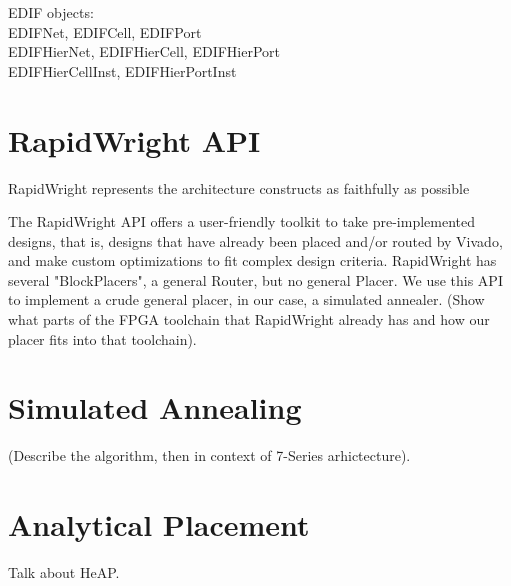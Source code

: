\documentclass{article}
\begin{document}
\begin{multicols}{2}
    EDIF objects: \\
        EDIFNet, EDIFCell, EDIFPort \\
        EDIFHierNet, EDIFHierCell, EDIFHierPort \\
        EDIFHierCellInst, EDIFHierPortInst \\


\section{RapidWright API}
    RapidWright represents the architecture constructs as faithfully as possible

    The RapidWright API offers a user-friendly toolkit to take pre-implemented designs, that is, designs that have already been placed and/or routed by Vivado, and make custom optimizations to fit complex design criteria. 
    RapidWright has several "BlockPlacers", a general Router, but no general Placer. 
    We use this API to implement a crude general placer, in our case, a simulated annealer. 
    (Show what parts of the FPGA toolchain that RapidWright already has and how our placer fits into that toolchain). 


\section{Simulated Annealing}
    (Describe the algorithm, then in context of 7-Series arhictecture). \\

\section{Analytical Placement}
    Talk about HeAP.


\end{multicols}
\end{document}
